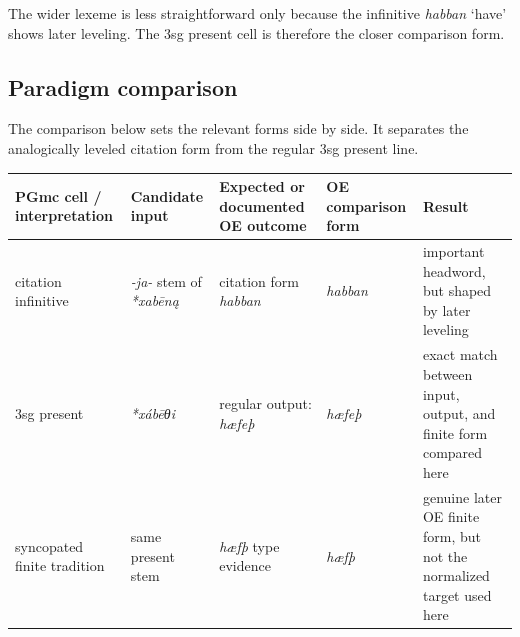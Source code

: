 \documentclass[
  british,
  a4paper,
  openany]{book}
\newcounter{none} %
\begin{document}
The wider lexeme is less straightforward only because the infinitive
{\emph{habban}} `have' shows later leveling. The 3sg present cell is
therefore the closer comparison form.

\subsection{Paradigm comparison}\label{paradigm-comparison-7}

The comparison below sets the relevant forms side by side. It separates
the analogically leveled citation form from the regular 3sg present
line.

{\def\LTcaptype{none} %
\begin{longtable}[]{@{}
  >{\raggedright\arraybackslash}p{}
  >{\raggedright\arraybackslash}p{}
  >{\raggedright\arraybackslash}p{}
  >{\raggedright\arraybackslash}p{}
  >{\raggedright\arraybackslash}p{}@{}}
\toprule\noalign{}
\begin{minipage}[b]{\linewidth}\raggedright
PGmc cell / interpretation
\end{minipage} & \begin{minipage}[b]{\linewidth}\raggedright
Candidate input
\end{minipage} & \begin{minipage}[b]{\linewidth}\raggedright
Expected or documented OE outcome
\end{minipage} & \begin{minipage}[b]{\linewidth}\raggedright
OE comparison form
\end{minipage} & \begin{minipage}[b]{\linewidth}\raggedright
Result
\end{minipage} \\
\midrule\noalign{}
\endhead
\bottomrule\noalign{}
\endlastfoot
citation infinitive & \emph{-ja-} stem of {\emph{*xabēną}} & citation
form {\emph{habban}} & {\emph{habban}} & important headword, but shaped
by later leveling \\
3sg present & {\emph{*xábēθi}} & regular output: {\emph{hæfeþ}} &
{\emph{hæfeþ}} & exact match between input, output, and finite form
compared here \\
syncopated finite tradition & same present stem & {\emph{hæfþ}} type
evidence & {\emph{hæfþ}} & genuine later OE finite form, but not the
normalized target used here \\
\end{longtable}
}
\end{document}
